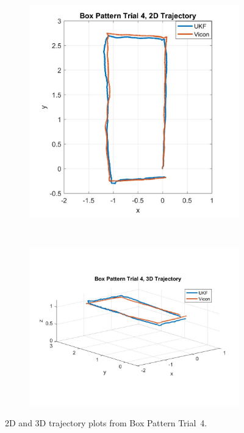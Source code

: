 \begin{figure}
    \centering
    \begin{subfigure}{0.4\textwidth}
        \includegraphics[width=\textwidth,left]{box4_2d}
    \end{subfigure}%
    ~ 
    \begin{subfigure}{0.6\textwidth}
        \centering
        \includegraphics[width=\textwidth,right]{box4_3d}
    \end{subfigure}
    \caption[Box Pattern Trial 4 Trajectory]{2D and 3D trajectory plots from Box Pattern Trial~4.}
    \label{box4_traj}
\end{figure}

